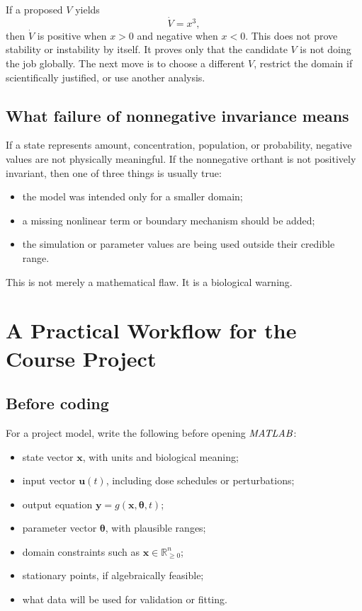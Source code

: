 \documentclass[a4paper]{article}
\newcommand{\R}{\mathbb{R}}
\newcommand{\vect}[1]{\boldsymbol{#1}}
\newcommand{\Rpos}{\R_{\ge 0}}
\newcommand{\MATLAB}{\ensuremath{\pksym{MATLAB}}}
\begin{document}
If a proposed \(V\) yields
\[
  \dot V=x^3,
\]
then \(\dot V\) is positive when \(x>0\) and negative when \(x<0\). This does not prove stability or instability by itself. It proves only that the candidate \(V\) is not doing the job globally. The next move is to choose a different \(V\), restrict the domain if scientifically justified, or use another analysis.

\subsection{What failure of nonnegative invariance means}

If a state represents amount, concentration, population, or probability, negative values are not physically meaningful. If the nonnegative orthant is not positively invariant, then one of three things is usually true:
\begin{itemize}[leftmargin=2em]
  \item the model was intended only for a smaller domain;
  \item a missing nonlinear term or boundary mechanism should be added;
  \item the simulation or parameter values are being used outside their credible range.
\end{itemize}
This is not merely a mathematical flaw. It is a biological warning.

\section{A Practical Workflow for the Course Project}

\subsection{Before coding}

For a project model, write the following before opening \MATLAB{}:
\begin{itemize}[leftmargin=2em]
  \item state vector \(\vect x\), with units and biological meaning;
  \item input vector \(\vect u(t)\), including dose schedules or perturbations;
  \item output equation \(\vect y=g(\vect x,\vect\theta,t)\);
  \item parameter vector \(\vect\theta\), with plausible ranges;
  \item domain constraints such as \(\vect x\in\Rpos^n\);
  \item stationary points, if algebraically feasible;
  \item what data will be used for validation or fitting.
\end{itemize}
\end{document}
